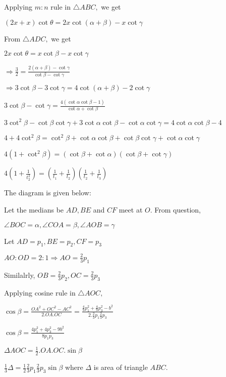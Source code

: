   Applying $m:n$ rule in $\triangle ABC,$ we get

  $(2x + x)\cot\theta = 2x\cot(\alpha + \beta) - x\cot\gamma$

  From $\triangle ADC,$ we get

  $2x\cot\theta = x\cot\beta - x\cot\gamma$

  $\Rightarrow \frac{3}{2} = \frac{2(\alpha + \beta) - \cot\gamma}{\cot\beta - \cot\gamma}$

  $\Rightarrow 3\cot\beta - 3\cot\gamma = 4\cot(\alpha + \beta) - 2\cot\gamma$

  $3\cot\beta - \cot\gamma = \frac{4(\cot\alpha\cot\beta - 1)}{\cot\alpha + \cot\beta}$

  $3\cot^2\beta - \cot\beta\cot\gamma + 3\cot\alpha\cot\beta - \cot\alpha\cot\gamma = 4\cot\alpha\cot\beta - 4$

  $4 + 4\cot^2\beta = \cot^2\beta + \cot\alpha\cot\beta + \cot\beta\cot\gamma + \cot\alpha\cot\gamma$

  $4(1 + \cot^2\beta) = (\cot\beta + \cot\alpha)(\cot\beta + \cot\gamma)$

  $4\left(1 + \frac{1}{t_2^2}\right) = \left(\frac{1}{t_1} + \frac{1}{t_2}\right)\left(\frac{1}{t_2} + \frac{1}{t_3}\right)$

\item The diagram is given below:

  \startplacefigure
    \externalfigure[18_16.pdf]
  \stopplacefigure

  Let the medians be $AD, BE$ and $CF$ meet at $O.$ From question,

  $\angle BOC=\alpha, \angle COA = \beta, \angle AOB = \gamma$

  Let $AD = p_1, BE=p_2, CF = p_3$

  $AO:OD = 2:1 \Rightarrow AO = \frac{2}{3}p_1$

  Similalrly, $OB = \frac{2}{3}p_2, OC = \frac{2}{3}p_3$

  Applying cosine rule in $\triangle AOC,$

  $\cos\beta = \frac{OA^2 + OC^2 - AC^2}{2.OA.OC} = \frac{\frac{4}{9}p_1^2 + \frac{4}{9}p_3^2 -
    b^2}{2.\frac{2}{3}p_1\frac{2}{3}p_3}$

  $\cos\beta = \frac{4p_1^2 + 4p_3^2 - 9b^2}{8p_1p_3}$

  $\Delta AOC = \frac{1}{2}.OA.OC.\sin\beta$

  $\frac{1}{3}\Delta = \frac{1}{2}\frac{2}{3}p_1\frac{2}{3}p_3\sin\beta$ where $\Delta$ is area of triangle $ABC.$


